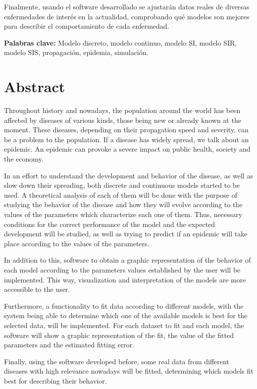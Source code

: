 Finalmente, usando el software desarrollado se ajustarán datos reales de diversas enfermedades de interés en la actualidad, comprobando qué modelos son mejores para describir el comportamiento de cada enfermedad.

\textbf{Palabras clave: } Modelo discreto, modelo continuo, modelo SI, modelo SIR, modelo SIS, propagación, epidemia, simulación.



\chapter*{Abstract}

Throughout history and nowadays, the population around the world has been affected by diseases of various kinds, those being new or already known at the moment. These diseases, depending on their propagation speed and severity, can be a problem to the population. If a disease has widely spread, we talk about an epidemic. An epidemic can provoke a severe impact on public health, society and the economy.

In an effort to understand the development and behavior of the disease, as well as slow down their spreading, both discrete and continuous models started to be used. A theoretical analysis of each of them will be done with the purpose of studying the behavior of the disease and how they will evolve according to the values of the parameters which characterize each one of them. Thus, necessary conditions for the correct performance of the model and the expected development will be studied, as well as trying to predict if an epidemic will take place according to the values of the parameters.

In addition to this, software to obtain a graphic representation of the behavior of each model according to the parameters values established by the user will be implemented. This way, visualization and interpretation of the models are more accessible to the user.

Furthermore, a functionality to fit data according to different models, with the system being able to determine which one of the available models is best for the selected data, will be implemented. For each dataset to fit and each model, the software will show a graphic representation of the fit, the value of the fitted parameters and the estimated fitting error.

Finally, using the software developed before, some real data from different diseases with high relevance nowadays will be fitted, determining which models fit best for describing their behavior.

